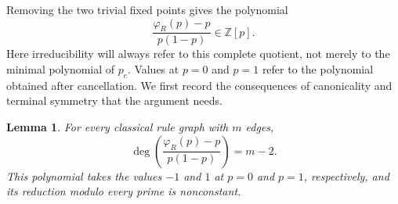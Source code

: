 \documentclass[scheme=plain,11pt]{ctexart}
\newtheorem{lemma}[theorem]{Lemma}
\theoremstyle{definition}
\theoremstyle{remark}
\begin{document}
Removing the two trivial fixed points gives the polynomial
\begin{equation}\label{eq:nontrivial-fixed-point-polynomial}
 \frac{\varphi_R(p)-p}{p(1-p)}\in\mathbb Z[p].
\end{equation}
Here irreducibility will always refer to this complete quotient, not merely to the minimal polynomial of $p_c$.
Values at $p=0$ and $p=1$ refer to the polynomial obtained after cancellation.
We first record the consequences of canonicality and terminal symmetry that the argument needs.

\begin{lemma}\label{lem:fixed-point-polynomial-structure}
For every classical rule graph with $m$ edges,
\[
 \deg\left(\frac{\varphi_R(p)-p}{p(1-p)}\right)=m-2.
\]
This polynomial takes the values $-1$ and $1$ at $p=0$ and $p=1$, respectively, and its reduction modulo every prime is nonconstant.
\end{lemma}
\end{document}
